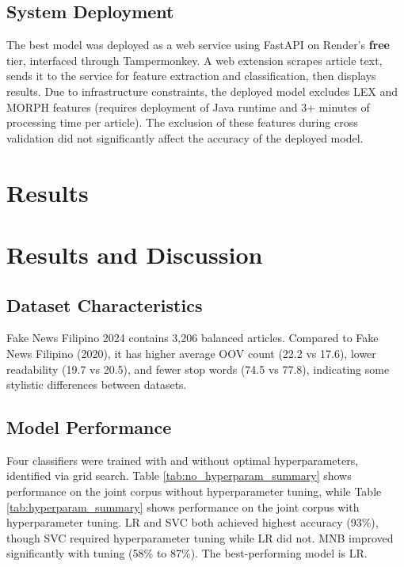 \documentclass[conference]{IEEEtran}
\begin{document}
\subsection{System Deployment}
The best model was deployed as a web service using FastAPI on Render's \textbf{free} tier, interfaced through Tampermonkey. A web extension scrapes article text, sends it to the service for feature extraction and classification, then displays results. Due to infrastructure constraints, the deployed model excludes LEX and MORPH features (requires deployment of Java runtime and 3+ minutes of processing time per article). The exclusion of these features during cross validation did not significantly affect the accuracy of the deployed model.

\section{Results}

\section{Results and Discussion}

\subsection{Dataset Characteristics}
Fake News Filipino 2024 contains 3,206 balanced articles. Compared to Fake News Filipino (2020), it has higher average OOV count (22.2 vs 17.6), lower readability (19.7 vs 20.5), and fewer stop words (74.5 vs 77.8), indicating some stylistic differences between datasets.

\subsection{Model Performance}
Four classifiers were trained with and without optimal hyperparameters, identified via grid search. Table \ref{tab:no_hyperparam_summary} shows performance on the joint corpus without hyperparameter tuning, while Table \ref{tab:hyperparam_summary} shows performance on the joint corpus with hyperparameter tuning. LR and SVC both achieved highest accuracy (93\%), though SVC required hyperparameter tuning while LR did not. MNB improved significantly with tuning (58\% to 87\%). The best-performing model is LR.
\end{document}
